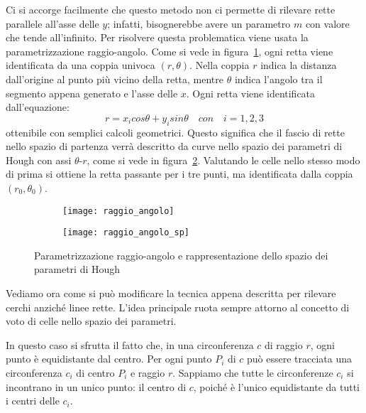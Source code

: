Ci si accorge facilmente che questo metodo non ci permette di rilevare rette parallele all'asse delle $y$; infatti, bisognerebbe avere un parametro $m$ con valore che tende all'infinito.
Per risolvere questa problematica viene usata la parametrizzazione raggio-angolo.
Come si vede in figura~\ref{fig:hough_parametr_parametr}, ogni retta viene identificata da una coppia univoca $(r,\theta)$.
Nella coppia $r$ indica la distanza dall'origine al punto più vicino della retta, mentre $\theta$ indica l'angolo tra il segmento appena generato e l'asse delle $x$.
Ogni retta viene identificata dall'equazione:
\begin{equation} \label{eq:raggio_angolo_parametr}
  r = x_i cos \theta + y_i sin \theta \quad con \quad i=1,2,3
\end{equation}
ottenibile con semplici calcoli geometrici.
Questo significa che il fascio di rette nello spazio di partenza verrà descritto da curve nello spazio dei parametri di Hough con assi $\theta$-$r$, come si vede in figura~\ref{fig:hough_parametr_curve}.
Valutando le celle nello stesso modo di prima si ottiene la retta passante per i tre punti, ma identificata dalla coppia $(r_0,\theta_0)$.

\begin{figure}[ht]
  \begin{center}
    \begin{subfigure}{.4\linewidth}
      \centering\texttt{[image: raggio\_angolo]}
      \caption{}
      \label{fig:hough_parametr_parametr}
    \end{subfigure}
    \begin{subfigure}{.4\linewidth}
      \centering\texttt{[image: raggio\_angolo\_sp]}
      \caption{}
      \label{fig:hough_parametr_curve}
    \end{subfigure}
  \end{center}
  \caption{Parametrizzazione raggio-angolo e rappresentazione dello spazio dei parametri di Hough}
  \label{fig:hough_parametr_raggio-angolo}
\end{figure}

Vediamo ora come si può modificare la tecnica appena descritta per rilevare cerchi anziché linee rette.
L'idea principale ruota sempre attorno al concetto di voto di celle nello spazio dei parametri.

In questo caso si sfrutta il fatto che, in una circonferenza $c$ di raggio $r$, ogni punto è equidistante dal centro.
Per ogni punto $P_i$ di $c$ può essere tracciata una circonferenza $c_i$ di centro $P_i$ e raggio $r$.
Sappiamo che tutte le circonferenze $c_i$ si incontrano in un unico punto: il centro di $c$, poiché è l'unico equidistante da tutti i centri delle $c_i$.

